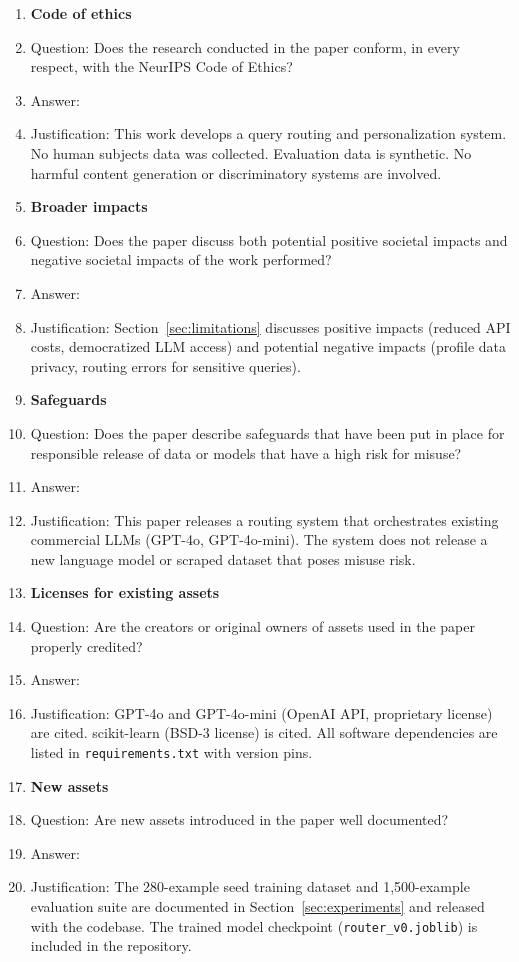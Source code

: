 \begin{enumerate}
\item {\bf Code of ethics}
    \item[] Question: Does the research conducted in the paper conform, in every respect, with the NeurIPS Code of Ethics?
    \item[] Answer: \answerYes{}
    \item[] Justification: This work develops a query routing and personalization system. No human subjects data was collected. Evaluation data is synthetic. No harmful content generation or discriminatory systems are involved.

\item {\bf Broader impacts}
    \item[] Question: Does the paper discuss both potential positive societal impacts and negative societal impacts of the work performed?
    \item[] Answer: \answerYes{}
    \item[] Justification: Section~\ref{sec:limitations} discusses positive impacts (reduced API costs, democratized LLM access) and potential negative impacts (profile data privacy, routing errors for sensitive queries).

\item {\bf Safeguards}
    \item[] Question: Does the paper describe safeguards that have been put in place for responsible release of data or models that have a high risk for misuse?
    \item[] Answer: \answerNA{}
    \item[] Justification: This paper releases a routing system that orchestrates existing commercial LLMs (GPT-4o, GPT-4o-mini). The system does not release a new language model or scraped dataset that poses misuse risk.

\item {\bf Licenses for existing assets}
    \item[] Question: Are the creators or original owners of assets used in the paper properly credited?
    \item[] Answer: \answerYes{}
    \item[] Justification: GPT-4o and GPT-4o-mini (OpenAI API, proprietary license) are cited. scikit-learn (BSD-3 license) is cited. All software dependencies are listed in \texttt{requirements.txt} with version pins.

\item {\bf New assets}
    \item[] Question: Are new assets introduced in the paper well documented?
    \item[] Answer: \answerYes{}
    \item[] Justification: The 280-example seed training dataset and 1,500-example evaluation suite are documented in Section~\ref{sec:experiments} and released with the codebase. The trained model checkpoint (\texttt{router\_v0.joblib}) is included in the repository.


\end{enumerate}
